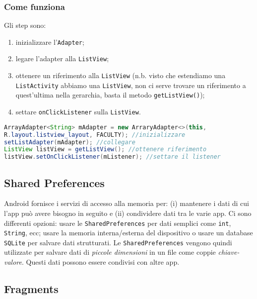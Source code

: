 \subsubsection{Come funziona}

Gli step sono:

\begin{enumerate}
\item inizializzare l'\texttt{Adapter};
\item legare l'adapter alla \texttt{ListView};
\item ottenere un riferimento alla \texttt{ListView} (n.b. visto che estendiamo
una \texttt{ListActivity} abbiamo una \texttt{ListView}, non ci serve trovare un
riferimento a quest'ultima nella gerarchia, basta il metodo
\texttt{getListView()});
\item settare \texttt{onClickListener} sulla \texttt{ListView}.
\end{enumerate}

\begin{lstlisting}[language=Java]
ArrayAdapter<String> mAdapter = new ArraryAdapter<>(this,
R.layout.listview_layout, FACULTY); //inizializzare
setListAdapter(mAdapter); //collegare
ListView listView = getListView(); //ottenere riferimento
listView.setOnClickListener(mListener); //settare il listener
\end{lstlisting}

\subsection{Shared Preferences}

Android fornisce i servizi di accesso alla memoria per: (i) mantenere i dati di
cui l'app può avere bisogno in seguito e (ii) condividere dati tra le varie app.
Ci sono differenti opzioni: usare le \texttt{SharedPreferences} per dati
semplici come \texttt{int}, \texttt{String}, ecc; usare la memoria
interna/esterna del dispositivo o usare un database \texttt{SQLite} per salvare
dati strutturati.
Le \texttt{SharedPreferences} vengono quindi utilizzate per salvare dati di 
\textit{piccole dimensioni} in un file come coppie \textit{chiave-valore}. 
Questi dati possono essere condivisi con altre app.

\subsection{Fragments}


